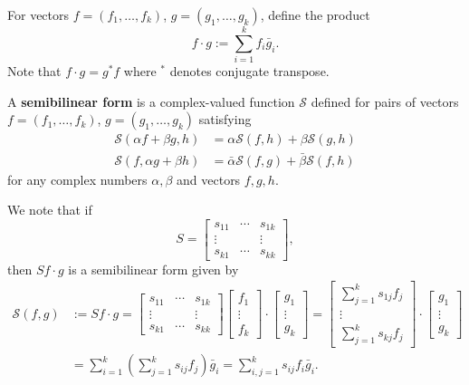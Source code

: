 \documentclass[11pt, oneside, a4paper]{article}
\begin{document}
\begin{defn}\cite[p.285]{CoddingtonLevinson}\label{defn:f cdot g}
    For vectors $f=(f_1,\ldots,f_k)$, $g=(g_1,\ldots,g_k)$, define the product
    \[f\cdot g:=\sum_{i=1}^k f_i\bar{g}_i.\]
    Note that $f\cdot g = g^*f$ where $^*$ denotes conjugate transpose.
\end{defn}

\begin{defn}\cite[p.285]{CoddingtonLevinson}\label{defn:semibilinear form}
    A \textbf{semibilinear form} is a complex-valued function $\mathcal{S}$ defined for pairs of vectors $f=(f_1,\ldots,f_k)$, $g=(g_1,\ldots,g_k)$ satisfying
    \begin{align*}
        \mathcal{S}(\alpha f+\beta g, h)&=\alpha\mathcal{S}(f,h) + \beta\mathcal{S}(g,h)\\
        \mathcal{S}(f, \alpha g + \beta h) &= \bar{\alpha}\mathcal{S}(f,g) + \bar{\beta}\mathcal{S}(f, h)
    \end{align*}
    for any complex numbers $\alpha, \beta$ and vectors $f,g,h$.
\end{defn}
We note that if
\[S = \begin{bmatrix}
    s_{11} & \cdots & s_{1k}\\
    \vdots &  & \vdots\\
    s_{k1} & \cdots & s_{kk}
\end{bmatrix},\]
then $Sf\cdot g$ is a semibilinear form given by
\begin{equation}\label{eq:semibilinear form}
    \begin{split}
    \mathcal{S}(f,g) &:= Sf\cdot g = \begin{bmatrix}
        s_{11} & \cdots & s_{1k}\\
        \vdots & & \vdots\\
        s_{k1} & \cdots & s_{kk}
    \end{bmatrix} \begin{bmatrix}
        f_1\\
        \vdots\\
        f_k
    \end{bmatrix} \cdot \begin{bmatrix}
        g_1\\
        \vdots\\
        g_k
    \end{bmatrix} = \begin{bmatrix}
        \sum_{j=1}^k s_{1j}f_j\\
        \vdots\\
        \sum_{j=1}^k s_{kj}f_j
    \end{bmatrix}\cdot \begin{bmatrix}
        g_1\\
        \vdots\\
        g_k
    \end{bmatrix}\\
    &= \sum_{i=1}^k\left(\sum_{j=1}^k s_{ij}f_j\right)\bar{g}_i =\sum_{i,j=1}^k s_{ij}f_i\bar{g}_i. 
    \end{split}
\end{equation}
\end{document}
